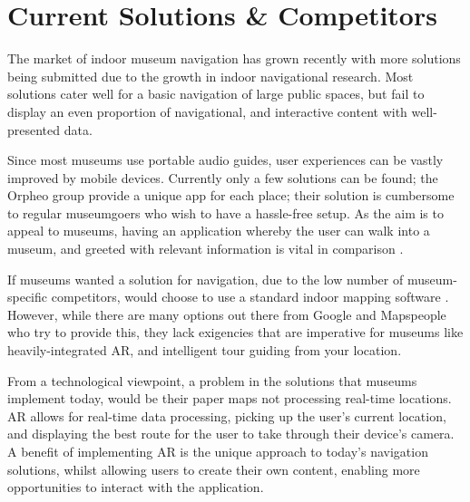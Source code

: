 
\section{Current Solutions \& Competitors}
The market of indoor museum navigation has grown recently with more solutions being submitted due to the growth in indoor navigational research. Most solutions cater well for a basic navigation of large public spaces, but fail to display an even proportion of navigational, and interactive content with well-presented data.

Since most museums use portable audio guides, user experiences can be vastly improved by mobile devices. Currently only a few solutions can be found; the Orpheo group \cite{orpheo} provide a unique app for each place; their solution is cumbersome to regular museumgoers who wish to have a hassle-free setup. As the aim is to appeal to museums, having an application whereby the user can walk into a museum, and greeted with relevant information is vital in comparison \cite{microsoft}.

If museums wanted a solution for navigation, due to the low number of museum-specific competitors, would choose to use a standard indoor mapping software \cite{engadget}. However, while there are many options out there from Google and Mapspeople \cite{mapspeople} who try to provide this, they lack exigencies that are imperative for museums like heavily-integrated AR, and intelligent tour guiding from your location.

From a technological viewpoint, a problem in the solutions that museums implement today, would be their paper maps not processing real-time locations. AR allows for real-time data processing, picking up the user's current location, and displaying the best route for the user to take through their device's camera. A benefit of implementing AR is the unique approach to today's navigation solutions, whilst allowing users to create their own content, enabling more opportunities to interact with the application.